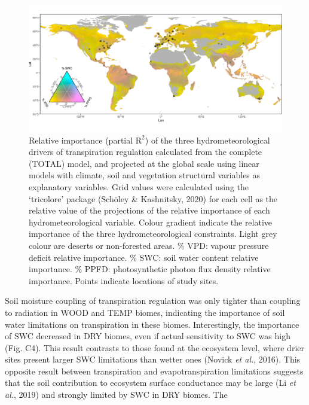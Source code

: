 \documentclass[11pt,twoside]{reedthesis}
\begin{document}
\begin{figure}[hbt!]

{\centering \includegraphics[width=1\linewidth]{figure/CH4/Figure3} 

}

\caption[Relative importance (partial $\text{R}^2$) of the three hydrometeorological drivers of transpiration regulation.]{Relative importance (partial \(\text{R}^2\)) of the three
hydrometeorological drivers of transpiration regulation calculated from
the complete (TOTAL) model, and projected at the global scale using
linear models with climate, soil and vegetation structural variables as
explanatory variables. Grid values were calculated using the `tricolore'
package (Schöley \& Kashnitsky, 2020) for each cell as the relative
value of the projections of the relative importance of each
hydrometeorological variable. Colour gradient indicate the relative
importance of the three hydrometeorological constraints. Light grey
colour are deserts or non-forested areas. \% VPD: vapour pressure
deficit relative importance. \% SWC: soil water content relative
importance. \% PPFD: photosynthetic photon flux density relative
importance. Points indicate locations of study sites.}\label{fig:ch4fig3}
\end{figure}
Soil moisture coupling of transpiration regulation was only tighter than
coupling to radiation in WOOD and TEMP biomes, indicating the importance
of soil water limitations on transpiration in these biomes.
Interestingly, the importance of SWC decreased in DRY biomes, even if
actual sensitivity to SWC was high (Fig. C4). This result contrasts to
those found at the ecosystem level, where drier sites present larger SWC
limitations than wetter ones (Novick \emph{et al.}, 2016). This opposite
result between transpiration and evapotranspiration limitations suggests
that the soil contribution to ecosystem surface conductance may be large
(Li \emph{et al.}, 2019) and strongly limited by SWC in DRY biomes. The
\end{document}
